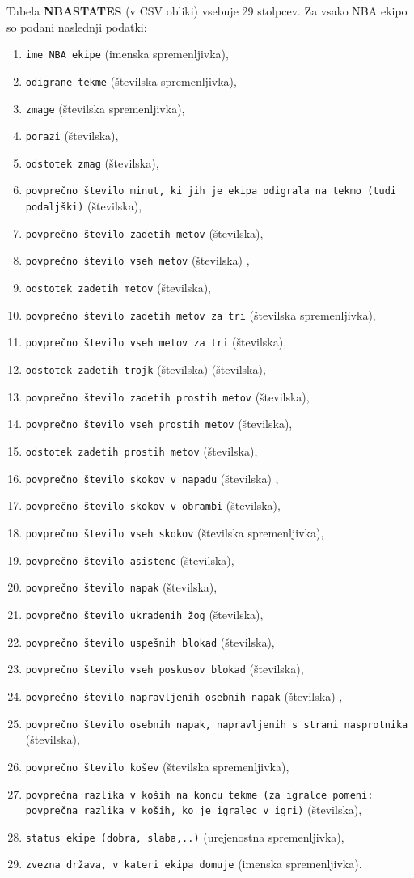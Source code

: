 \documentclass[11pt,a4paper]{article}
\begin{document}
Tabela \textbf{NBASTATES} (v CSV obliki) vsebuje 29 stolpcev. Za vsako NBA ekipo so podani naslednji podatki:

\begin{enumerate}
\item{\verb|ime NBA ekipe| (imenska spremenljivka),}
\item{\verb|odigrane tekme| (številska spremenljivka),}
\item{\verb|zmage| (številska spremenljivka),}
\item{ \verb|porazi| (številska),}
\item{\verb|odstotek zmag| (številska),}
\item{\verb|povprečno število minut, ki jih je ekipa odigrala na tekmo (tudi podaljški)| (številska),}
\item{\verb|povprečno število zadetih metov| (številska),}
\item{\verb|povprečno število vseh metov| (številska) ,}
\item{\verb|odstotek zadetih metov| (številska),}
\item{\verb|povprečno število zadetih metov za tri| (številska spremenljivka),}
\item{\verb|povprečno število vseh metov za tri| (številska),}
\item{ \verb|odstotek zadetih trojk| (številska) (številska),}
\item{\verb|povprečno število zadetih prostih metov| (številska),}
\item{\verb|povprečno število vseh prostih metov| (številska),}
\item{\verb|odstotek zadetih prostih metov| (številska),}
\item{\verb|povprečno število skokov v napadu| (številska) ,}
\item{\verb|povprečno število skokov v obrambi| (številska),}
\item{\verb|povprečno število vseh skokov| (številska spremenljivka),}
\item{\verb|povprečno število asistenc| (številska),}
\item{ \verb|povprečno število napak| (številska),}
\item{\verb|povprečno število ukradenih žog| (številska),}
\item{\verb|povprečno število uspešnih blokad| (številska),}
\item{\verb|povprečno število vseh poskusov blokad| (številska),}
\item{\verb|povprečno število napravljenih osebnih napak| (številska) ,}
\item{\verb|povprečno število osebnih napak, napravljenih s strani nasprotnika| (številska),}
\item{\verb|povprečno število košev| (številska spremenljivka),}
\item{\verb|povprečna razlika v koših na koncu tekme (za igralce pomeni: povprečna razlika v koših, ko je igralec v igri)| (številska),}
\item{\verb|status ekipe (dobra, slaba,..)| (urejenostna spremenljivka),}
\item{\verb|zvezna država, v kateri ekipa domuje| (imenska spremenljivka).}
\end{enumerate}
\end{document}

